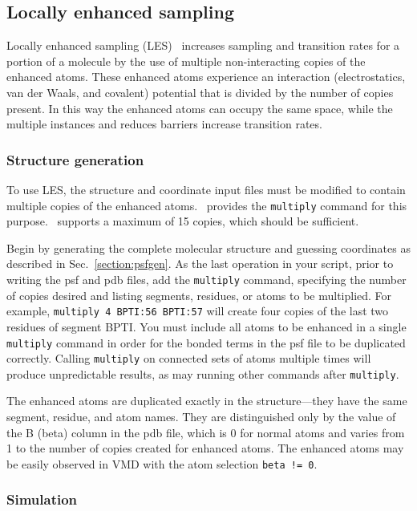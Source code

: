 \subsection{Locally enhanced sampling}
\label{section:les}

Locally enhanced sampling (LES)~\cite{ROIT91,SIMM98,SIMM00} increases
sampling and transition rates for a portion of a molecule by the use of
multiple non-interacting copies of the enhanced atoms.  These enhanced
atoms experience an interaction (electrostatics, van der Waals, and
covalent) potential that is divided by the number of copies present.
In this way the enhanced atoms can occupy the same space, while the
multiple instances and reduces barriers increase transition rates.

\subsubsection{Structure generation}

To use LES, the structure and coordinate input files must be modified to
contain multiple copies of the enhanced atoms.  \PSFGEN\ provides the
{\tt multiply} command for this purpose.  \NAMD\ supports a maximum of 15
copies, which should be sufficient.  

Begin by generating the complete molecular structure and guessing
coordinates as described in Sec.~\ref{section:psfgen}.  As the last
operation in your script, prior to writing the psf and pdb files, add
the {\tt multiply} command, specifying the number of copies desired and
listing segments, residues, or atoms to be multiplied.  For example,
\verb#multiply 4 BPTI:56 BPTI:57# will create four copies of the last
two residues of segment BPTI.  You must include all atoms to be
enhanced in a single {\tt multiply} command in order for the bonded
terms in the psf file to be duplicated correctly.  Calling {\tt multiply}
on connected sets of atoms multiple times will produce unpredictable
results, as may running other commands after {\tt multiply}.

The enhanced atoms are duplicated exactly in the structure---they have
the same segment, residue, and atom names.  They are distinguished only
by the value of the B (beta) column in the pdb file, which is 0 for
normal atoms and varies from 1 to the number of copies created for
enhanced atoms.  The enhanced atoms may be easily observed in VMD with
the atom selection \verb#beta != 0#.

\subsubsection{Simulation}

